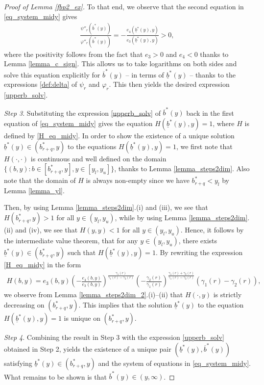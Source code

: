 \documentclass[11pt]{article} %
\renewcommand{\phi}{\varphi}
\newcommand{\ubar}[1]{\underaccent{\bar}{#1}}
\numberwithin{komcounter}{section}
\renewcommand{\ubar}{\underline}
\renewcommand{\bar}{\overline}
\numberwithin{equation}{section}
\numberwithin{theorem}{section}
\begin{document}
\begin{proof}[Proof of Lemma \ref{fbp2_ex}]
To that end, we observe that the second equation in \eqref{eq_system_midy} gives 
\begin{align*}
\frac{\psi''_r(\bar{b}^*(y))}{\phi''_r(\bar{b}^*(y))} = -\frac{e_4(\ubar{b}^*(y),y)}{e_3(\ubar{b}^*(y),y)} > 0,
\end{align*}
where the positivity follows from the fact that $e_3>0$ and $e_4<0$ thanks to Lemma \ref{lemma_c_sign}. 
This allows us to take logarithms on both sides and solve this equation explicitly for $\bar{b}^*(y)$ -- in terms of $\ubar{b}^*(y)$ -- thanks to the expressions \eqref{def:delta} of $\psi_r$ and $\phi_r$. 
This then yields the desired expression \eqref{upperb_solv}.

\vspace{1mm}
{\it Step 3}. 
Substituting the expression \eqref{upperb_solv} of $\bar{b}^*(y)$ back in the first equation of \eqref{eq_system_midy} gives the equation $H(\ubar{b}^*(y),y) = 1$, where $H$ is defined by \eqref{H_eq_midy}. 
In order to show the existence of a unique solution $\ubar{b}^*(y) \in (b^*_{r+q},y)$ to the equations $H(\ubar{b}^*(y),y)=1$, we first note that $H(\cdot,\cdot)$ is continuous and well defined on the domain $\{(b,y) : b \in [b^*_{r+q},y], y\in[y_l,y_u]\}$, thanks to Lemma \ref{lemma_steps2dim}.
Also note that the domain of $H$ is always non-empty since we have $b^*_{r+q}<y_l$ by Lemma \ref{lemma_yl}.

Then, by using Lemma \ref{lemma_steps2dim}.(i) and (iii), we see that $H(b^*_{r+q},y)>1$ for all $y\in (y_l,y_u)$, while by using Lemma \ref{lemma_steps2dim}.(ii) and (iv), we see that $H(y,y)<1$ for all $y\in (y_l,y_u)$. 
Hence, it follows by the intermediate value theorem, that for any $y\in (y_l,y_u)$, there exists $\ubar{b}^*(y) \in (b^*_{r+q},y)$ such that $H(\ubar{b}^*(y),y)=1$. 
By rewriting the expression \eqref{H_eq_midy} in the form
\begin{align} \label{H_eq_midy2}
H(b,y)= e_3(b,y)\left(-\frac{e_4(b,y)}{ e_3(b,y)}\right)^{\frac{\gamma_1(r)}{\gamma_1(r)-\gamma_2(r)}}\left(-\frac{\gamma_2(r)}{\gamma_1(r)}\right)^{\frac{\gamma_1(r)+\gamma_2(r)}{\gamma_1(r)-\gamma_2(r)}}(\gamma_1(r)-\gamma_2(r)),
\end{align}
we observe from Lemma \ref{lemma_steps2dim_2}.(i)--(ii) that $H(\cdot,y)$ is strictly decreasing on $(b^*_{r+q},y)$. 
This implies that the solution $\ubar{b}^*(y)$ to the equation $H(\ubar{b}^*(y),y)=1$ is unique on $(b^*_{r+q}, y)$. 

\vspace{1mm}
{\it Step 4}.
Combining the result in Step 3 with the expression \eqref{upperb_solv} obtained in Step 2, yields the existence of a unique pair $(\ubar{b}^*(y),\bar{b}^*(y))$ satisfying $\ubar{b}^*(y) \in (b^*_{r+q}, y)$ and the system of equations in \eqref{eq_system_midy}. 
What remains to be shown is that $\bar{b}^*(y) \in (y,\infty)$. 


\end{proof}
\end{document}
